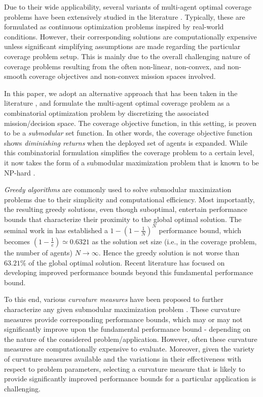 \documentclass[letterpaper, 10 pt, conference]{ieeeconf}
\begin{document}
Due to their wide applicability, several variants of multi-agent optimal coverage problems have been extensively studied in the literature \cite{Zhong2011,Luo2019,Welikala2019J1,Yu2022}. Typically, these are formulated as continuous optimization problems inspired by real-world conditions. However, their corresponding solutions are computationally expensive unless significant simplifying assumptions are made regarding the particular coverage problem setup. This is mainly due to the overall challenging nature of coverage problems resulting from the often non-linear, non-convex, and non-smooth coverage objectives and non-convex mission spaces involved.   

In this paper, we adopt an alternative approach that has been taken in the literature \cite{Sun2019,Sun2020}, and formulate the multi-agent optimal coverage problem as a combinatorial optimization problem by discretizing the associated mission/decision space. The coverage objective function, in this setting, is proven to be a \emph{submodular} set function. In other words, the coverage objective function shows \emph{diminishing returns} when the deployed set of agents is expanded. While this combinatorial formulation simplifies the coverage problem to a certain level, it now takes the form of a submodular maximization problem that is known to be NP-hard \cite{Corneuejols1977,Nemhauser1978}.    

\emph{Greedy algorithms} are commonly used to solve submodular maximization problems due to their simplicity and computational efficiency. Most importantly, the resulting greedy solutions, even though suboptimal, entertain performance bounds that characterize their proximity to the global optimal solution. The seminal work in \cite{Nemhauser1978} has established a $1-(1-\frac{1}{N})^N$ performance bound, which becomes $(1-\frac{1}{e}) \simeq 0.6321$ as the solution set size (i.e., in the coverage problem, the number of agents) $N\rightarrow \infty$. Hence the greedy solution is not worse than $63.21\%$ of the global optimal solution. Recent literature has focused on developing improved performance bounds beyond this fundamental performance bound. 


To this end, various \emph{curvature measures} have been proposed to further characterize any given submodular maximization problem \cite{Conforti1984,Wang2016,Liu2018,WelikalaJ02021}. These curvature measures provide corresponding performance bounds, which may or may not significantly improve upon the fundamental performance bound - depending on the nature of the considered problem/application. However, often these curvature measures are computationally expensive to evaluate. Moreover, given the variety of curvature measures available and the variations in their effectiveness with respect to problem parameters, selecting a curvature measure that is likely to provide significantly improved performance bounds for a particular application is challenging.    
\end{document}
